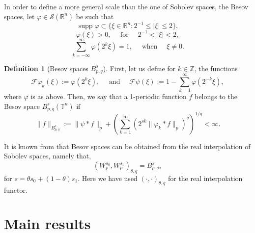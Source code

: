 \documentclass[12pt, reqno]{amsart}
\theoremstyle{definition}
\newtheorem{definition}[theorem]{Definition}
\theoremstyle{remark}
\numberwithin{equation}{section}
\DeclareMathOperator{\supp}{supp}
\begin{document}
In order to define a more general scale than the one of Sobolev spaces, the Besov spaces, let $\varphi\in\mathcal{S}(\mathbb{R}^n)$ be such that
    \begin{equation*}
        \supp \varphi \subset \{\xi \in \mathbb{R}^n : 2^{-1} \leq |\xi| \leq 2\}, 
    \end{equation*}
    \begin{equation*}
        \varphi(\xi) > 0, \quad \text{ for } \quad 2^{-1}<|\xi| < 2,
    \end{equation*}
    \begin{equation*}
        \sum_{k=-\infty}^\infty \varphi(2^k\xi) = 1, \quad \text{ when } \quad \xi \neq 0.
    \end{equation*}
\begin{definition}[Besov spaces $B^s_{p,q}$]
    First, let us define for $k \in \mathbb{Z}$, the functions
    \begin{equation*}
        \mathcal{F}\varphi_k(\xi) := \varphi(2^k\xi), \quad \text{ and } \quad \mathcal{F}\psi(\xi)  := 1 - \sum_{k=1}^\infty \varphi(2^{-k}\xi),
    \end{equation*}
    where $\varphi$ is as above. Then, we say that a 1-periodic function $f$ belongs to the Besov space $B^s_{p,q}(\mathbb{T}^n)$ if 
    \begin{equation*}
        \|f\|_{B^s_{p,q}} := \|\psi * f\|_p + \left( \sum_{k=1}^\infty (2^{sk} \|\varphi_k*f \|_p)^q
        \right)^{1/q} < \infty.
    \end{equation*}
\end{definition}
It is known from \cite[Theorem~6.2.4]{bergh-lofstrom} that Besov spaces can be obtained from the real interpolation of Sobolev spaces, namely that,
\begin{equation*}
    (W^{s_0}_p, W^{s_1}_p)_{\theta, q} = B^s_{p,q},
\end{equation*}
for $s = \theta s_0 + (1-\theta)s_1$. Here we have used $(\cdot,\cdot)_{\theta,q}$ for the real interpolation functor.

\section{Main results}
\label{section:main}
\end{document}
